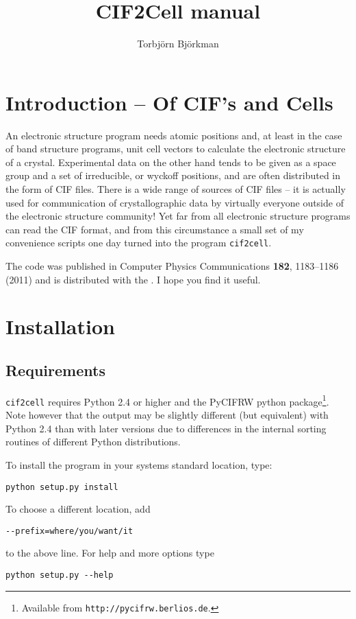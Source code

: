 \documentclass[11pt]{article}
\title{CIF2Cell manual}
\author{Torbj\"orn Bj\"orkman}
\newcommand{\ciftocell}{\texttt{cif2cell}}
\begin{document}
\maketitle
\section*{Introduction -- Of CIF's and Cells}
An electronic structure program needs atomic positions and, at least in the case of band structure programs, unit cell vectors to calculate the electronic structure of a crystal. Experimental data on the other hand tends to be given as a space group and a set of irreducible, or wyckoff positions, and are often distributed in the form of CIF files. There is a wide range of sources of CIF files -- it is actually used for communication of crystallographic data by virtually everyone outside of the electronic structure community! Yet far from all electronic structure programs can read the CIF format, and from this circumstance a small set of my convenience scripts one day turned into the program \ciftocell.


The code was published in Computer Physics Communications {\bf 182}, 1183--1186 (2011) and is distributed with the . I hope you find it useful.

\newpage
\section{Installation}
\subsection{Requirements}
\ciftocell{} requires Python 2.4 or higher and the PyCIFRW python package\footnote{Available from \texttt{http://pycifrw.berlios.de}.}. Note however that the output may be slightly different (but equivalent) with Python 2.4 than with later versions due to differences in the internal sorting routines of different Python distributions.

To install the program in your systems standard location, type:
\begin{verbatim}
python setup.py install 
\end{verbatim}
To choose a different location, add 
\begin{verbatim}
--prefix=where/you/want/it 
\end{verbatim}
to the above line. For help and more options type
\begin{verbatim}
python setup.py --help
\end{verbatim}
\end{document}
